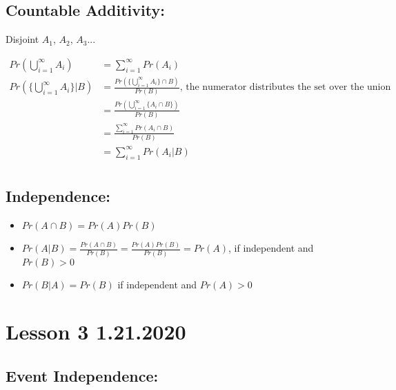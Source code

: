 \documentclass[11pt,letterpaper,titlepage]{article}
\begin{document}
\subsection{Countable Additivity:}

Disjoint $A_1$, $A_2$, $A_3$...

\begin{equation*}
    \begin{aligned}
        Pr(\bigcup\limits_{i=1}^{\infty} A_i) &= \sum_{i=1}^{\infty} Pr(A_i) \\
        Pr(\{\bigcup\limits_{i=1}^{\infty} A_i\}|B) &= \frac{Pr(\{\bigcup\limits_{i=1}^{\infty} A_i \}\cap B)}{Pr(B)} \text{, the numerator distributes the set over the union} \\
        &= \frac{Pr(\bigcup\limits_{i=1}^{\infty} \{A_i \cap B\})}{Pr(B)} \\
        &= \frac{\sum\limits_{i=1}^{\infty} Pr(A_i \cap B)}{Pr(B)} \\
        &= \sum\limits_{i=1}^{\infty} Pr(A_i | B) \\
    \end{aligned}
\end{equation*}

\subsection{Independence:}

\begin{itemize}

    \item $Pr(A \cap B) = Pr(A) Pr(B)$
    
    \item $Pr(A|B) = \frac{Pr(A \cap B)}{Pr(B)} = \frac{Pr(A)Pr(B)}{Pr(B)} = Pr(A)$, if independent and $Pr(B) > 0$
    
    \item $Pr(B|A) = Pr(B)$ if independent and $Pr(A) > 0$
    
\end{itemize}

\newpage

\section{Lesson 3 1.21.2020}

\subsection{Event Independence:}
\end{document}
